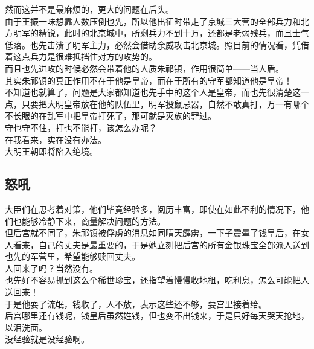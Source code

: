 \begin{multicols}{\theparacolNo}
然而这并不是最麻烦的，更大的问题在后头。\\

由于王振一味想靠人数压倒也先，所以他出征时带走了京城三大营的全部兵力和北方明军的精锐，此时的北京城中，所剩兵力不到十万，还都是老弱残兵，而且士气低落。也先击溃了明军主力，必然会借助余威攻击北京城。照目前的情况看，凭借着这点兵力是很难抵挡住对方的攻势的。\\

而且也先进攻的时候必然会带着他的人质朱祁镇，作用很简单——当人盾。\\

其实朱祁镇的真正作用不在于他是皇帝，而在于所有的守军都知道他是皇帝！\\

不知道也就算了，问题是大家都知道也先手中的这个人是皇帝，而也先很清楚这一点，只要把大明皇帝放在他的队伍里，明军投鼠忌器，自然不敢真打，万一有哪个不长眼的在乱军中把皇帝打死了，那可就是灭族的罪过。\\

守也守不住，打也不能打，该怎么办呢？\\

在我看来，实在没有办法。\\

大明王朝即将陷入绝境。\\

\subsection{怒吼}
大臣们在思考着对策，他们毕竟经验多，阅历丰富，即使在如此不利的情况下，他们也能够冷静下来，商量解决问题的方法。\\

但后宫就不同了，朱祁镇被俘虏的消息如同晴天霹雳，一下子震晕了钱皇后，在女人看来，自己的丈夫是最重要的，于是她立刻把后宫的所有金银珠宝全部派人送到也先的军营里，希望能够赎回丈夫。\\

人回来了吗？当然没有。\\

也先好不容易抓到这么个稀世珍宝，还指望着慢慢收地租，吃利息，怎么可能把人送回来！\\

于是他耍了流氓，钱收了，人不放，表示这些还不够，要宫里接着给。\\

后宫哪里还有钱呢，钱皇后虽然姓钱，但也变不出钱来，于是只好每天哭天抢地，以泪洗面。\\

没经验就是没经验啊。\\


\end{multicols}
